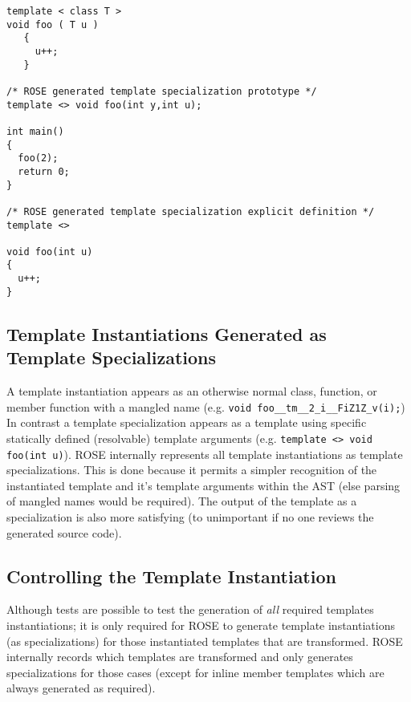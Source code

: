 {{\indent
{\mySmallFontSize

\begin{verbatim}
template < class T >
void foo ( T u )
   {
     u++;
   }

/* ROSE generated template specialization prototype */
template <> void foo(int y,int u);

int main()
{
  foo(2);
  return 0;
}

/* ROSE generated template specialization explicit definition */
template <> 

void foo(int u)
{
  u++;
}
\end{verbatim}
}}

\subsection{Template Instantiations Generated as Template Specializations}
   A template instantiation appears as an otherwise normal class, function, or member
function with a mangled name (e.g. {\tt void foo\_\_tm\_\_2\_i\_\_FiZ1Z\_v(i);})
In contrast a template specialization appears as a template using specific
statically defined (resolvable) template arguments (e.g. 
{\tt template <> void foo(int u)}).  ROSE internally represents all 
template instantiations as template specializations.  This is done 
because it permits a simpler recognition of the instantiated template and it's template
arguments within the AST (else parsing of mangled names would be required).  The output 
of the template as a specialization is also more satisfying (to unimportant if no
one reviews the generated source code).


\subsection{Controlling the Template Instantiation}
   Although tests are possible to test the generation of {\em all} required 
templates instantiations; it is only required for ROSE to generate template
instantiations (as specializations) for those instantiated templates that are
transformed.  ROSE internally records which templates are transformed
and only generates specializations for those cases (except for inline member
templates which are always generated as required).


}

